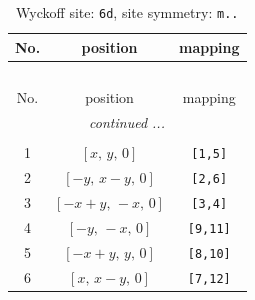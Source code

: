 \documentclass[fleqn,8pt]{jsarticle}
\begin{document}
\renewcommand{\arraystretch}{1.2}
\begin{longtable}{ccc}
\caption{Wyckoff site: {\tt 6d}, site symmetry: {\tt m..}}
 \\
 \hline \hline
No. & position & mapping \\ \hline \endfirsthead

\multicolumn{2}{l}{\tablename\ \thetable{}} \\
 \hline \hline
No. & position & mapping \\ \hline \endhead

 \hline \hline
\multicolumn{2}{r}{\footnotesize\it continued ...} \\ \endfoot

 \hline \hline
\multicolumn{2}{r}{} \\ \endlastfoot

1 & $\left[ x,\, y,\, 0 \right]$ & {\tt [1,5]} \\ \hline
2 & $\left[ - y,\, x - y,\, 0 \right]$ & {\tt [2,6]} \\ \hline
3 & $\left[ - x + y,\, - x,\, 0 \right]$ & {\tt [3,4]} \\ \hline
4 & $\left[ - y,\, - x,\, 0 \right]$ & {\tt [9,11]} \\ \hline
5 & $\left[ - x + y,\, y,\, 0 \right]$ & {\tt [8,10]} \\ \hline
6 & $\left[ x,\, x - y,\, 0 \right]$ & {\tt [7,12]} \\
\end{longtable}
\renewcommand{\arraystretch}{1.2}
\end{document}
